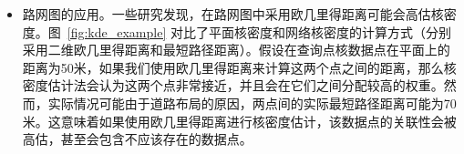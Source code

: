 \begin{itemize}[leftmargin=*]
\begin{figure}[h!]
\begin{subfigure}{0.45\linewidth}
			\caption{下午3点到6点的热力图}
			\label{subfig:afternoon_heatmap}
		\end{subfigure}
		\caption{不同时间窗口下的热力图对比。}
		\label{fig:temporal_heatmap}
	\end{figure}
	
	在这些情况下，单纯依赖空间距离进行核密度估计可能无法全面捕捉数据的真实特征和变化规律。为了更准确地分析这些复杂现象，我们需要将时间维度也纳入考虑范围。这意味着不仅要关注数据点的地理位置和空间距离，还需评估事件发生的时间间隔及其演变过程。这种方法有助于揭示出数据集在时间轴上的动态变化，以及在时间和空间上不同数据点之间的潜在关联性。

	具体来说，用户可能会选择过滤特定时间段内的事件，以揭示数据点在时间维度上的关联~\cite{brunsdon_visualising_2007}。这种方法不仅可以帮助我们更好地理解事件的时间模式，还能为决策提供有价值的参考信息。例如，Uber Movement可以展示了特定时间段内的人口流动热图，如图~\ref{fig:temporal_heatmap}所示，这是2020年第一季度旧金山地区在凌晨3点到6点以及下午3点到6点两个不同时间段的交通流动性热图。可以很明显的看到下午3点到6点的流动性较高，且主干道的密度大于其他街道。这些密度较高的地区会更加拥堵，可以给后续的出租车派单和导航给出一定参考信息。
	
	\item 路网图的应用。一些研究发现，在路网图中采用欧几里得距离可能会高估核密度。图~\ref{fig:kde_example} 对比了平面核密度和网络核密度的计算方式（分别采用二维欧几里得距离和最短路径距离）。假设在查询点核数据点在平面上的距离为50米，如果我们使用欧几里得距离来计算这两个点之间的距离，那么核密度估计法会认为这两个点非常接近，并且会在它们之间分配较高的权重。然而，实际情况可能由于道路布局的原因，两点间的实际最短路径距离可能为70米。这意味着如果使用欧几里得距离进行核密度估计，该数据点的关联性会被高估，甚至会包含不应该存在的数据点。
	

\end{itemize}
